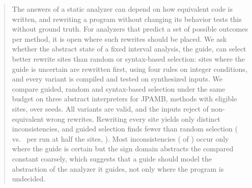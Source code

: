 \begin{abstract}
The answers of a static analyzer can depend on how equivalent code is written,
and rewriting a program without changing its behavior tests this without
ground truth. For analyzers that predict a set of possible outcomes per method,
it is open where such rewrites should be placed. We ask whether the abstract
state of a fixed interval analysis, the guide, can select better rewrite
sites than random or syntax-based selection: sites where the guide is uncertain are rewritten first,
using four rules on integer conditions, and every variant is compiled and
tested on synthesized inputs. We compare guided, random and syntax-based
selection under the same budget on three abstract interpreters for JPAMB,
\NumMethods{} methods with \NumSites{} eligible sites, over \NumSeeds{} seeds.
All \NumValid{} variants are valid, and the inputs reject
\NumMutantsKilled{} of \NumMutantsNonEquivalent{} non-equivalent wrong
rewrites. Rewriting every site yields only \Pool{} distinct inconsistencies,
and guided selection finds fewer than random selection (\MeanGuidedHalf{} vs.\
\MeanRandomHalf{} per run at half the sites, \PGuidedRandomHalf). Most
inconsistencies (\PoolFromSettledOnly{} of \Pool{}) occur only where the guide
is certain but the sign domain abstracts the compared constant coarsely, which suggests that a guide should model the
abstraction of the analyzer it guides, not only where the program is undecided.
\end{abstract}
